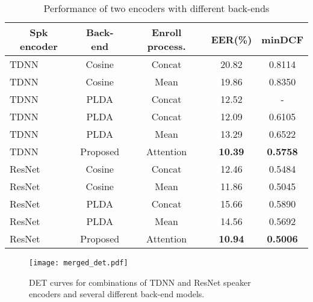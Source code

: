 \documentclass[a4paper]{article}
\begin{document}
\setlength{\tabcolsep}{1.5mm}
\begin{table}[t]
\footnotesize
  \caption{Performance of two encoders with different back-ends}
  \label{tab:result1}
  \vspace{-2mm}
  \centering
  \begin{tabular}{l c c c c}
    \toprule
    \multicolumn{1}{c}{\textbf{Spk encoder}} & \multicolumn{1}{c}{\textbf{Back-end}} & \multicolumn{1}{c}{\textbf{Enroll process.}} & \multicolumn{1}{c}{\textbf{EER(\%)}} & \multicolumn{1}{c}{\textbf{minDCF}}\\
    \midrule
    TDNN   & Cosine     & Concat    & 20.82    & 0.8114                     \\
    TDNN   & Cosine     & Mean      & 19.86    & 0.8350                     \\
    TDNN \cite{Li2020-CN2} & PLDA & Concat & 12.52   & -                    \\
    TDNN   & PLDA     & Concat    & 12.09           & 0.6105                \\
    TDNN   & PLDA     & Mean      & 13.29           & 0.6522                \\
    TDNN   & Proposed & Attention & \textbf{10.39}  & \textbf{0.5758}       \\ \midrule
    ResNet & Cosine   & Concat    & 12.46           & 0.5484                \\
    ResNet & Cosine   & Mean      & 11.86           & 0.5045                \\
    ResNet & PLDA     & Concat    & 15.66           & 0.5890                \\
    ResNet & PLDA     & Mean      & 14.56           & 0.5692                \\
    ResNet & Proposed & Attention & \textbf{10.94}  & \textbf{0.5006}       \\
    \bottomrule
  \end{tabular}
   \vspace{-2mm}
\end{table}


\begin{figure}
    \centering
    \caption{DET curves for combinations of TDNN and ResNet speaker encoders and several different back-end models.} \vspace{-1mm}
    \label{fig:det_tdnn}
    \texttt{[image: merged\_det.pdf]}
    \vspace{-7mm}
\end{figure}
\end{document}
